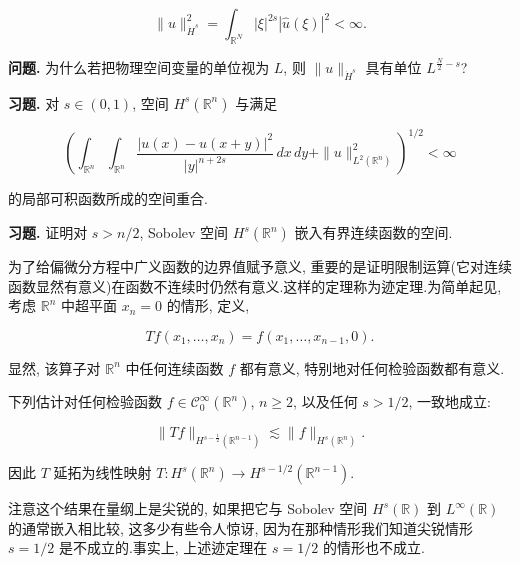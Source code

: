 \begin{equation}
\|u\|_{\dot{H}^s}^2 = \int_{\mathbb{R}^N}|\xi|^{2s}|\hat{u}(\xi)|^2 < \infty.\label{eq:c6-209}
\end{equation}

\textbf{问题.} 为什么若把物理空间变量的单位视为 $L$, 则 $\|u\|_{\dot{H}^s}$ 具有单位 $L^{\frac{N}{2}-s}$?

\textbf{习题.} 对 $s\in(0, 1)$, 空间 $H^s(\mathbb{R}^n)$ 与满足

\begin{equation}
\left(\int_{\mathbb{R}^n}\int_{\mathbb{R}^n}\frac{|u(x)-u(x+y)|^2}{|y|^{n+2s}}\, dx\, dy + \|u\|_{L^2(\mathbb{R}^n)}^2\right)^{1/2} < \infty\label{eq:c6-210}
\end{equation}

的局部可积函数所成的空间重合.

\textbf{习题.} 证明对 $s > n/2$, Sobolev 空间 $H^s(\mathbb{R}^n)$ 嵌入有界连续函数的空间.


为了给偏微分方程中广义函数的边界值赋予意义, 重要的是证明限制运算(它对连续函数显然有意义)在函数不连续时仍然有意义.这样的定理称为迹定理.为简单起见, 考虑 $\mathbb{R}^n$ 中超平面 $x_n = 0$ 的情形, 定义,

\begin{equation}
Tf(x_1, \ldots, x_n) = f(x_1, \ldots, x_{n-1}, 0).\label{eq:c6-211}
\end{equation}

显然, 该算子对 $\mathbb{R}^n$ 中任何连续函数 $f$ 都有意义, 特别地对任何检验函数都有意义.

\begin{theorem}\label{thm:c6-2.24}
下列估计对任何检验函数 $f\in\mathcal{C}_0^\infty(\mathbb{R}^n)$, $n\ge 2$, 以及任何 $s>1/2$, 一致地成立:

\begin{equation}
\|Tf\|_{H^{s-\frac{1}{2}}(\mathbb{R}^{n-1})} \lesssim \|f\|_{H^s(\mathbb{R}^n)}.\label{eq:c6-212}
\end{equation}

因此 $T$ 延拓为线性映射 $T : H^s(\mathbb{R}^n)\to H^{s-1/2}(\mathbb{R}^{n-1})$.
\end{theorem}

\begin{remark*}
注意这个结果在量纲上是尖锐的, 如果把它与 Sobolev 空间 $H^s(\mathbb{R})$ 到 $L^\infty(\mathbb{R})$ 的通常嵌入相比较, 这多少有些令人惊讶, 因为在那种情形我们知道尖锐情形 $s = 1/2$ 是不成立的.事实上, 上述迹定理在 $s = 1/2$ 的情形也不成立.
\end{remark*}

